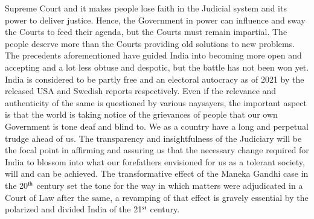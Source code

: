 \begin{multicols}{2}
Supreme Court and it makes people lose faith in the Judicial system and its power to deliver
justice. Hence, the Government in power can influence and sway the Courts to feed their
agenda, but the Courts must remain impartial. The people deserve more than the Courts
providing old solutions to new problems. The precedents aforementioned have guided India
into becoming more open and accepting and a lot less obtuse and despotic, but the battle has
not been won yet. India is considered to be partly free and an electoral autocracy as of 2021
by the released USA and Swedish reports respectively. Even if the relevance and authenticity
of the same is questioned by various naysayers, the important aspect is that the world is
taking notice of the grievances of people that our own Government is tone deaf and blind to.
We as a country have a long and perpetual trudge ahead of us. The transparency and
insightfulness of the Judiciary will be the focal point in affirming and assuring us that the
necessary change required for India to blossom into what our forefathers envisioned for us as
a tolerant society, will and can be achieved. The transformative effect of the Maneka Gandhi
case in the 20$^{\rm th}$ century set the tone for the way in which matters were adjudicated in a Court
of Law after the same, a revamping of that effect is gravely essential by the polarized and
divided India of the 21$^{\rm st}$ century.

\end{multicols}
\label{end2020-art5}
